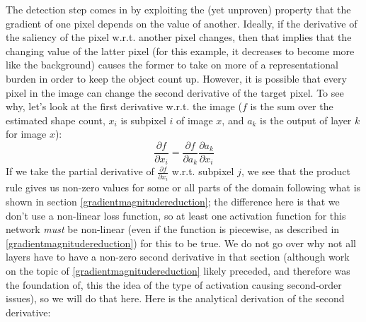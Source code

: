 The detection step comes in by exploiting the (yet unproven) property that the gradient of one pixel
depends on the value of another. Ideally, if the derivative of the saliency of the pixel w.r.t.
another pixel changes, then that implies that the changing value of the latter pixel (for this
example, it decreases to become more like the background) causes the former to take on more of a
representational burden in order to keep the object count up. However, it is possible that every
pixel in the image can change the second derivative of the target pixel. To see why, let's look at
the first derivative w.r.t. the image ($f$ is the sum over the estimated shape count, $x_i$ is
subpixel $i$ of image $x$, and $a_k$ is the output of layer $k$ for image $x$):
\[
    \frac{\partial f}{\partial x_i} = \frac{\partial f}{\partial a_k} \frac{\partial a_k}{\partial x_i}
\]
If we take the partial derivative of $\frac{\partial f}{\partial x_i}$ w.r.t. subpixel $j$, we see
that the product rule gives us non-zero values for some or all parts of the domain following what is
shown in section \ref{gradientmagnitudereduction}; the difference here is that we don't use a
non-linear loss function, so at least one activation function for this network \textit{must} be
non-linear (even if the function is piecewise, as described in \ref{gradientmagnitudereduction}) for
this to be true. We do not go over why not all layers have to have a non-zero second derivative in
that section (although work on the topic of \ref{gradientmagnitudereduction} likely preceded, and
therefore was the foundation of, this the idea of the type of activation causing second-order
issues), so we will do that here. Here is the analytical derivation of the second derivative:
